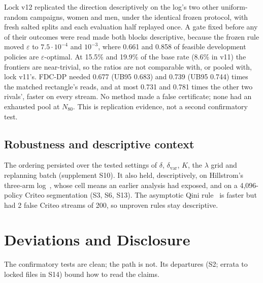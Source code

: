 \documentclass[sigconf,anonymous,review]{acmart}
\newcommand{\eps}{\varepsilon}
\newcommand{\dvar}{\delta_{\text{var}}}
\begin{document}
Lock v12 replicated the direction descriptively on the log's two other uniform-random campaigns, women and men, under the identical frozen protocol, with fresh salted splits and each evaluation half replayed once. A gate fixed before any of their outcomes were read made both blocks descriptive, because the frozen rule moved $\eps$ to $7.5 \cdot 10^{-4}$ and $10^{-3}$, where 0.661 and 0.858 of feasible development policies are $\eps$-optimal. At 15.5\% and 19.9\% of the base rate (8.6\% in v11) the frontiers are near-trivial, so the ratios are not comparable with, or pooled with, lock v11's. FDC-DP needed 0.677 (UB95 0.683) and 0.739 (UB95 0.744) times the matched rectangle's reads, and at most 0.731 and 0.781 times the other two rivals', faster on every stream. No method made a false certificate; none had an exhausted pool at $N_{80}$. This is replication evidence, not a second confirmatory test.

\subsection{Robustness and descriptive context}\label{sec:external}

The ordering persisted over the tested settings of $\delta$, $\dvar$, $K$, the $\lambda$ grid and replanning batch (supplement S10). It also held, descriptively, on Hillstrom's three-arm log~\citep{hillstrom2008minethatdata}, whose cell means an earlier analysis had exposed, and on a 4,096-policy Criteo segmentation (S3, S6, S13). The asymptotic Qini rule~\citep{sverdrup2023qini} is faster but had 2 false Criteo streams of 200, so unproven rules stay descriptive.

\section{Deviations and Disclosure}\label{sec:deviations}

The confirmatory tests are clean; the path is not. Its departures (S2; errata to locked files in S14) bound how to read the claims.
\end{document}
